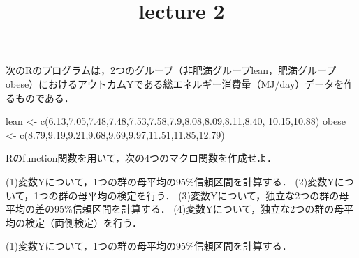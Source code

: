 \documentclass[
]{article}
\title{lecture 2}
\author{}
\date{\vspace{-2.5em}}
\newenvironment{Shaded}{\begin{snugshade}}{\end{snugshade}}
\newcommand{\FloatTok}[1]{\textcolor[rgb]{0.00,0.00,0.81}{#1}}
\newcommand{\FunctionTok}[1]{\textcolor[rgb]{0.00,0.00,0.00}{#1}}
\newcommand{\NormalTok}[1]{#1}
\newcommand{\OtherTok}[1]{\textcolor[rgb]{0.56,0.35,0.01}{#1}}
\begin{document}
\maketitle

次のRのプログラムは，2つのグループ（非肥満グループlean，肥満グループobese）におけるアウトカムYである総エネルギー消費量（MJ/day）データを作るものである．

\begin{Shaded}
\begin{Highlighting}[]
\NormalTok{lean }\OtherTok{\textless{}{-}} \FunctionTok{c}\NormalTok{(}\FloatTok{6.13}\NormalTok{,}\FloatTok{7.05}\NormalTok{,}\FloatTok{7.48}\NormalTok{,}\FloatTok{7.48}\NormalTok{,}\FloatTok{7.53}\NormalTok{,}\FloatTok{7.58}\NormalTok{,}\FloatTok{7.9}\NormalTok{,}\FloatTok{8.08}\NormalTok{,}\FloatTok{8.09}\NormalTok{,}\FloatTok{8.11}\NormalTok{,}\FloatTok{8.40}\NormalTok{, }\FloatTok{10.15}\NormalTok{,}\FloatTok{10.88}\NormalTok{)}
\NormalTok{obese }\OtherTok{\textless{}{-}} \FunctionTok{c}\NormalTok{(}\FloatTok{8.79}\NormalTok{,}\FloatTok{9.19}\NormalTok{,}\FloatTok{9.21}\NormalTok{,}\FloatTok{9.68}\NormalTok{,}\FloatTok{9.69}\NormalTok{,}\FloatTok{9.97}\NormalTok{,}\FloatTok{11.51}\NormalTok{,}\FloatTok{11.85}\NormalTok{,}\FloatTok{12.79}\NormalTok{) }
\end{Highlighting}
\end{Shaded}

Rのfunction関数を用いて，次の4つのマクロ関数を作成せよ．

(1)変数Yについて，1つの群の母平均の95\%信頼区間を計算する．
(2)変数Yについて，1つの群の母平均の検定を行う．
(3)変数Yについて，独立な2つの群の母平均の差の95\%信頼区間を計算する．
(4)変数Yについて，独立な2つの群の母平均の検定（両側検定）を行う．

(1)変数Yについて，1つの群の母平均の95\%信頼区間を計算する．
\end{document}
